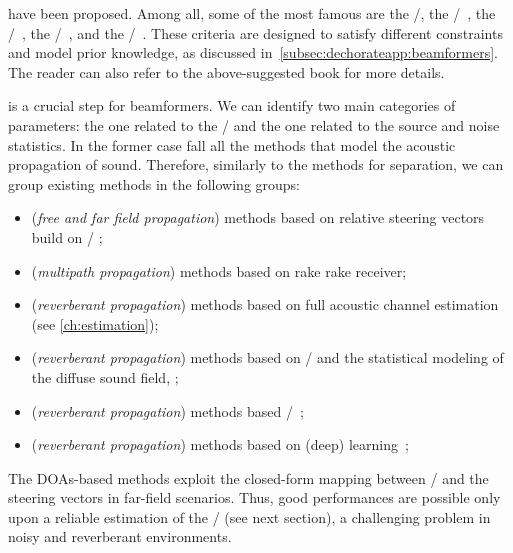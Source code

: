  have been proposed.
Among all, some of the most famous are the \DStxt/, the \MVDRtxt/~, the \MaxSNRtxt/~, the \MaxSINRtxt/~, and the \LCMVtxt/~.
These criteria are designed to satisfy different constraints and model prior knowledge, as discussed in~\cref{subsec:dechorateapp:beamformers}.
The reader can also refer to the above-suggested book for more details.

 is a crucial step for beamformers.
We can identify two main categories of parameters: the one related to the \RIRs/ and the one related to the source and noise statistics.
In the former case fall all the methods that model the acoustic propagation of sound.
Therefore, similarly to the methods for separation, we can group existing methods in the following groups:
\begin{itemize}
    \item (\textit{free and far field propagation}) methods based on relative steering vectors build on \DOA/ ;
    \item (\textit{multipath propagation}) methods based on rake rake receiver;
    \item (\textit{reverberant propagation}) methods based on full acoustic channel estimation (see \cref{ch:estimation});
    \item (\textit{reverberant propagation}) methods based on \DOAs/ and the statistical modeling of the diffuse sound field, ;
    \item (\textit{reverberant propagation}) methods based \ReTF/~;
    \item (\textit{reverberant propagation}) methods based on (deep) learning~;
\end{itemize}
The \acp{DOA}-based methods exploit the closed-form mapping between \DOAs/ and the steering vectors in far-field scenarios.
Thus, good performances are possible only upon a reliable estimation of the \DOAs/ (see next section), a challenging problem in noisy and reverberant environments.
